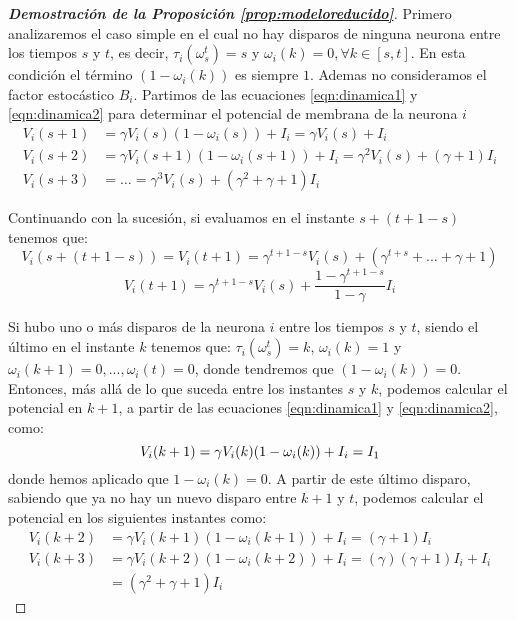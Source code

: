 \begin{proof}[\bf{Demostración de la Proposición \ref{prop:modeloreducido}}]
Primero analizaremos el caso simple en el cual no hay disparos de ninguna neurona entre los tiempos $s$ y $t$, es decir, $\tau_i(\omega_s^t)=s$ y $\omega_i(k)=0, \forall k \in [s,t]$. En esta condición el término $(1-\omega_i(k))$ es siempre $1$. Ademas no consideramos el factor estocástico $B_i$. Partimos de las ecuaciones \eqref{eqn:dinamica1} y \eqref{eqn:dinamica2} para determinar el potencial de membrana de la neurona $i$
\begin{align*}
    V_i(s+1) &= \gamma V_i(s)(1-\omega_i(s)) +I_i = \gamma V_i(s) +I_i\\
    V_i(s+2) &= \gamma V_i(s+1)(1-\omega_i(s+1)) +I_i = \gamma^2 V_i(s) + (\gamma + 1) I_i \\
    V_i(s+3) &= \ldots = \gamma^3 V_i(s) + (\gamma^2+\gamma + 1) I_i
\end{align*}

Continuando con la sucesión, si evaluamos en el instante $s + (t+1-s)$ tenemos que:
\begin{equation*}
    V_i(s+(t+1-s)) = V_i(t+1) = \gamma^{t+1-s} V_i(s)+(\gamma^{t+s} +...+\gamma+1)
\end{equation*}
\begin{equation}
    V_i(t+1) =\gamma^{t+1-s}V_i(s)+\frac{1-\gamma^{t+1-s}}{1-\gamma} I_i
    \label{eqn:potencial1}
\end{equation}

Si hubo uno o más disparos de la neurona $i$ entre los tiempos $s$ y $t$, siendo el último en el instante $k$ tenemos que: $\tau_i(\omega_s^t)=k$, $\omega_i(k)=1$ y $\omega_i(k+1)=0,...,\omega_i(t)=0$, donde tendremos que $(1-\omega_i(k))=0$. Entonces, más allá de lo que suceda entre los instantes $s$ y $k$, podemos calcular el potencial en $k+1$, a partir de las ecuaciones \eqref{eqn:dinamica1} y \eqref{eqn:dinamica2}, como:
\begin{equation*}
    V_i(k+1) = \gamma V_i(k)(1-\omega_i(k)) + I_i = I_1 \\
\end{equation*}
donde hemos aplicado que $1-\omega_i(k)=0$. A partir de este último disparo, sabiendo que ya no hay un nuevo disparo entre $k+1$ y $t$, podemos calcular el potencial en los siguientes instantes como: 
\begin{align*}
    V_i(k+2) &= \gamma V_i(k+1)(1-\omega_i(k+1)) +I_i = (\gamma+1) I_i \\
    V_i(k+3) &= \gamma V_i(k+2)(1-\omega_i(k+2)) +I_i = (\gamma) (\gamma+1) I_i + I_i\\
             &= (\gamma^2+\gamma + 1) I_i 
\end{align*}


\end{proof}
